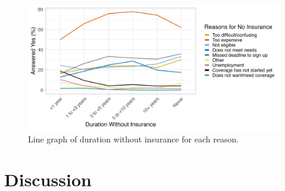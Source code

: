 \documentclass[12pt]{article}
\begin{document}
\begin{figure}[H]
  \centering
  \includegraphics[width=18cm]{figures/duration_no_insurance_by_reason.png}
  \caption{Line graph of duration without insurance for each reason.}
\end{figure}


\newpage
\section{Discussion}
\end{document}

